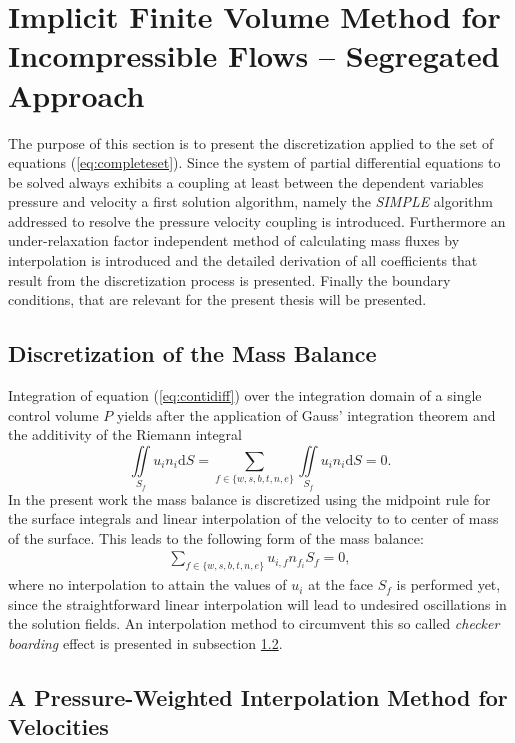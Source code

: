 \section{Implicit Finite Volume Method for Incompressible Flows -- Segregated Approach}

  The purpose of this section is to present the discretization applied to the set of equations (\ref{eq:completeset}). Since the system of partial differential equations to be solved always exhibits a coupling at least between the dependent variables pressure and velocity a first solution algorithm, namely the \emph{SIMPLE} algorithm addressed to resolve the pressure velocity coupling is introduced. Furthermore an under-relaxation factor independent method of calculating mass fluxes by interpolation is introduced and the detailed derivation of all coefficients that result from the discretization process is presented. Finally the boundary conditions, that are relevant for the present thesis will be presented.

\subsection{Discretization of the Mass Balance}
Integration of equation (\ref{eq:contidiff}) over the integration domain of a single control volume \(P\) yields after the application of Gauss' integration theorem and the additivity of the Riemann integral
\begin{displaymath}
  \iint\limits_{S_f} u_i n_i \mathrm{d}S = \sum_{f \in \{w,s,b,t,n,e\}} \iint\limits_{S_f} u_i n_{i} \mathrm{d}S = 0.
\end{displaymath}
In the present work the mass balance is discretized using the midpoint rule for the surface integrals and linear interpolation of the velocity to to center of mass of the surface. This leads to the following form of the mass balance:
\begin{align}
  \label{eq:massbalance}
\sum_{f \in \{w,s,b,t,n,e\}} u_{i,f} n_{f_i} S_f = 0,
\end{align}
where no interpolation to attain the values of \(u_i\) at the face \(S_f\) is performed yet, since the straightforward linear interpolation will lead to undesired oscillations in the solution fields. An interpolation method to circumvent this so called \emph{checker boarding} effect is presented in subsection \ref{sec:massflux}.

  \subsection{A Pressure-Weighted Interpolation Method for Velocities}
  \label{sec:massflux}

